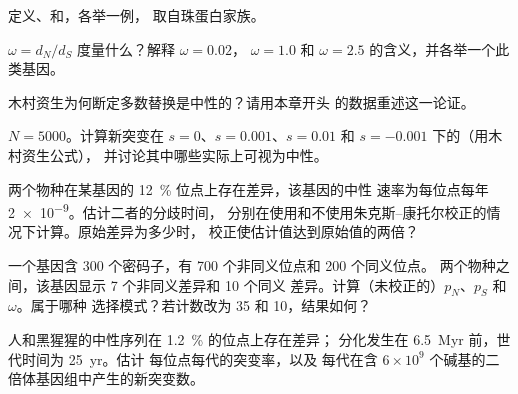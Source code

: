 \begin{exercise}[$\star$]\label{exo:b3:molecular-evolution:2}
定义、和，各举一例，
取自珠蛋白家族。
\end{exercise}

\begin{exercise}[$\star$]\label{exo:b3:molecular-evolution:3}
$\omega = d_{N}/d_{S}$ 度量什么？解释 $\omega = 0.02$，
$\omega = 1.0$ 和 $\omega = 2.5$ 的含义，并各举一个此类基因。
\end{exercise}

\begin{exercise}[$\star$]\label{exo:b3:molecular-evolution:4}
木村资生为何断定多数替换是中性的？请用本章开头
的数据重述这一论证。
\end{exercise}

\begin{exercise}[$\star\star$]\label{exo:b3:molecular-evolution:5}
$N = 5000$。计算新突变在 $s
= 0$、$s = 0.001$、$s = 0.01$ 和 $s = -0.001$ 下的（用木村资生公式），
并讨论其中哪些实际上可视为中性。
\end{exercise}

\begin{exercise}[$\star\star$]\label{exo:b3:molecular-evolution:6}
两个物种在某基因的 \qty{12}{\%} 位点上存在差异，该基因的中性
速率为每位点每年 \qty{2e-9}{}。估计二者的分歧时间，
分别在使用和不使用朱克斯–康托尔校正的情况下计算。原始差异为多少时，
校正使估计值达到原始值的两倍？
\end{exercise}

\begin{exercise}[$\star\star$]\label{exo:b3:molecular-evolution:7}
一个基因含 300 个密码子，有 700 个非同义位点和 200 个同义位点。
两个物种之间，该基因显示 7 个非同义差异和 10 个同义
差异。计算（未校正的）$p_{N}$、$p_{S}$ 和 $\omega$。属于哪种
选择模式？若计数改为 35 和 10，结果如何？
\end{exercise}

\begin{exercise}[$\star\star$]\label{exo:b3:molecular-evolution:8}
人和黑猩猩的中性序列在 \qty{1.2}{\%} 的位点上存在差异；
分化发生在 \qty{6.5}{Myr} 前，世代时间为 \qty{25}{yr}。估计
每位点每代的突变率，以及
每代在含 $6\times 10^{9}$ 个碱基的二倍体基因组中产生的新突变数。
\end{exercise}

